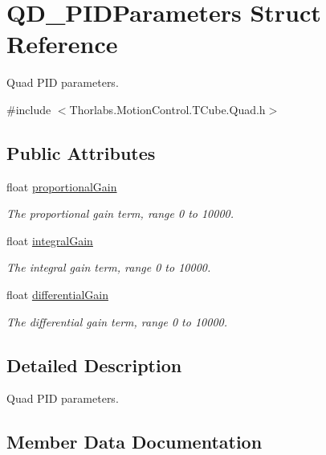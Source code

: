 \hypertarget{struct_q_d___p_i_d_parameters}{}\section{Q\+D\+\_\+\+P\+I\+D\+Parameters Struct Reference}
\label{struct_q_d___p_i_d_parameters}


Quad P\+ID parameters.  




{\ttfamily \#include $<$Thorlabs.\+Motion\+Control.\+T\+Cube.\+Quad.\+h$>$}

\subsection*{Public Attributes}
\begin{DoxyCompactItemize}
\item 
float \hyperlink{struct_q_d___p_i_d_parameters_a3916d7b784411f22cbaecce06c486d9a}{proportional\+Gain}
\begin{DoxyCompactList}\small\item\em The proportional gain term, range 0 to 10000. \end{DoxyCompactList}\item 
float \hyperlink{struct_q_d___p_i_d_parameters_a32844a65e26149b27db9b84a16d135e0}{integral\+Gain}
\begin{DoxyCompactList}\small\item\em The integral gain term, range 0 to 10000. \end{DoxyCompactList}\item 
float \hyperlink{struct_q_d___p_i_d_parameters_a6c68bd1f2567bbacfae56ecdd3ef6fd7}{differential\+Gain}
\begin{DoxyCompactList}\small\item\em The differential gain term, range 0 to 10000. \end{DoxyCompactList}\end{DoxyCompactItemize}


\subsection{Detailed Description}
Quad P\+ID parameters. 



\subsection{Member Data Documentation}
